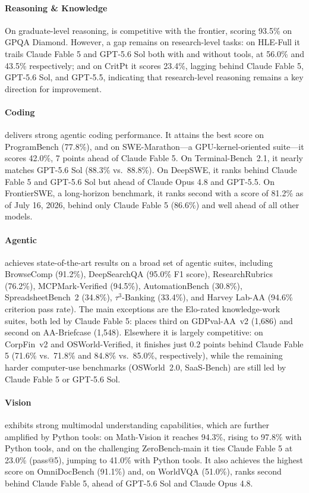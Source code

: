 \paragraph{Reasoning \& Knowledge}
On graduate-level reasoning,  is competitive with the frontier, scoring 93.5\% on GPQA Diamond. However, a gap remains on research-level tasks: on HLE-Full it trails Claude Fable 5 and GPT-5.6 Sol both with and without tools, at 56.0\% and 43.5\% respectively; and on CritPt it scores 23.4\%, lagging behind Claude Fable 5, GPT-5.6 Sol, and GPT-5.5, indicating that research-level reasoning remains a key direction for improvement.

\paragraph{Coding}
 delivers strong agentic coding performance. It attains the best score on
ProgramBench (77.8\%), and on SWE-Marathon---a GPU-kernel-oriented suite---it
scores 42.0\%, 7 points ahead of Claude Fable 5. On Terminal-Bench~2.1, it nearly matches GPT-5.6 Sol (88.3\% vs.\ 88.8\%). On DeepSWE, it ranks behind Claude Fable 5 and GPT-5.6 Sol but ahead of Claude Opus 4.8 and GPT-5.5. On FrontierSWE, a long-horizon benchmark, it ranks second with a score of 81.2\% as of July 16, 2026, behind only Claude Fable 5 (86.6\%) and well ahead of all other models.

\paragraph{Agentic}
 achieves state-of-the-art results on a broad set of agentic suites, including BrowseComp (91.2\%), DeepSearchQA (95.0\% F1 score), ResearchRubrics (76.2\%), MCPMark-Verified (94.5\%), AutomationBench (30.8\%), SpreadsheetBench~2 (34.8\%), $\tau^3$-Banking (33.4\%), and Harvey Lab-AA (94.6\% criterion pass rate). The main exceptions are the Elo-rated knowledge-work suites, both led by Claude Fable 5:  places third on GDPval-AA~v2
(1{,}686) and second on AA-Briefcase (1{,}548).  Elsewhere it is largely competitive: on CorpFin~v2 and OSWorld-Verified, it finishes just 0.2 points behind Claude
Fable 5 (71.6\% vs.\ 71.8\% and 84.8\% vs.\ 85.0\%, respectively), while the remaining harder
computer-use benchmarks (OSWorld~2.0, SaaS-Bench) are still led by Claude Fable 5 or
GPT-5.6 Sol.


\paragraph{Vision}
 exhibits strong multimodal understanding capabilities, which are further amplified by Python tools: on Math-Vision it reaches 94.3\%, rising to 97.8\% with Python tools, and on the challenging ZeroBench-main it ties Claude Fable 5 at 23.0\% (pass@5), jumping to 41.0\% with Python tools. It also achieves the highest score on OmniDocBench (91.1\%) and, on WorldVQA (51.0\%), ranks second behind
Claude Fable 5, ahead of GPT-5.6 Sol and Claude Opus 4.8.

